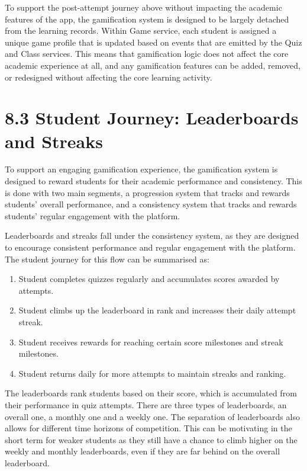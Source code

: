 \documentclass[
  12pt,
  a4paper,
]{report}
\begin{document}
To support the post-attempt journey above without impacting the academic features of the app,
the gamification system is designed to be largely detached from the learning records.
Within Game service, each student is assigned a unique game profile that is updated
based on events that are emitted by the Quiz and Class services. This means that
gamification logic does not affect the core academic experience at all, and any
gamification features can be added, removed, or redesigned without
affecting the core learning activity.

\hypertarget{leaderboards-streaks-and-overall-score}{%
\section{8.3 Student Journey: Leaderboards and Streaks}\label{leaderboards-streaks-and-overall-score}}

To support an engaging gamification experience, the gamification system
is designed to reward students for their academic performance and
consistency. This is done with two main segments, a progression system
that tracks and rewards students' overall performance, and a consistency
system that tracks and rewards students' regular engagement with the platform.

Leaderboards and streaks fall under the consistency system, as they are designed to encourage consistent
performance and regular engagement with the platform. The student journey for this flow can be summarised as:

\begin{enumerate}
  \item Student completes quizzes regularly and accumulates scores awarded by attempts.
  \item Student climbs up the leaderboard in rank and increases their daily attempt streak.
  \item Student receives rewards for reaching certain score milestones and streak milestones.
  \item Student returns daily for more attempts to maintain streaks and ranking.
\end{enumerate}

The leaderboards rank students based on their score, which is
accumulated from their performance in quiz attempts. There are three types of
leaderboards, an overall one, a monthly one and a weekly one. The separation of
leaderboards also allows for different time horizons of competition. This can be
motivating in the short term for weaker students as they still have a chance to
climb higher on the weekly and monthly leaderboards, even if they are far behind
on the overall leaderboard.
\end{document}
